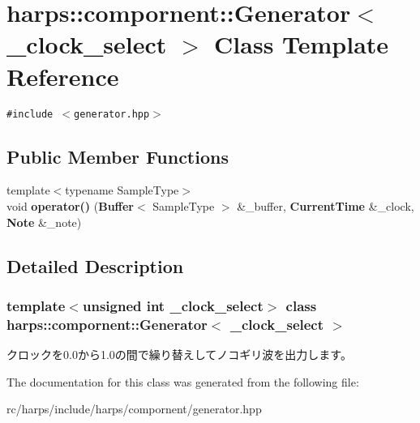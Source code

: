 \section{harps::compornent::Generator$<$ \_\-clock\_\-select $>$ Class Template Reference}
\label{classharps_1_1compornent_1_1Generator}
{\tt \#include $<$generator.hpp$>$}

\subsection*{Public Member Functions}
\begin{CompactItemize}
\item 
{\footnotesize template$<$typename SampleType$>$ }\\void \textbf{operator()} ({\bf Buffer}$<$ SampleType $>$ \&\_\-buffer, {\bf CurrentTime} \&\_\-clock, {\bf Note} \&\_\-note)\label{classharps_1_1compornent_1_1Generator_4d3f29a1db7b951848d118dcc34af58d}

\end{CompactItemize}


\subsection{Detailed Description}
\subsubsection*{template$<$unsigned int \_\-clock\_\-select$>$ class harps::compornent::Generator$<$ \_\-clock\_\-select $>$}

クロックを0.0から1.0の間で繰り替えしてノコギリ波を出力します。 

The documentation for this class was generated from the following file:\begin{CompactItemize}
\item 
rc/harps/include/harps/compornent/generator.hpp\end{CompactItemize}
